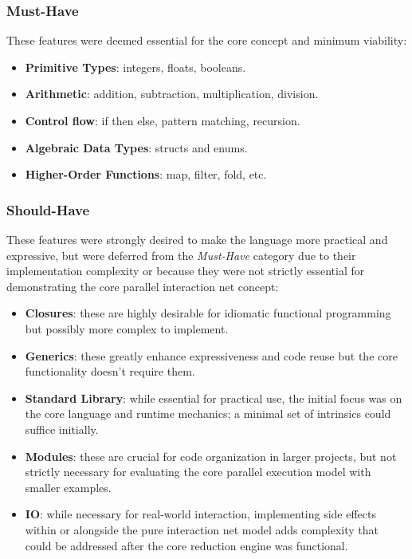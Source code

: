\subsubsection*{Must-Have}
These features were deemed essential for the core concept and minimum viability:
\begin{itemize}
    \item \textbf{Primitive Types}: integers, floats, booleans.
    \item \textbf{Arithmetic}: addition, subtraction, multiplication, division.
    \item \textbf{Control flow}: if then else, pattern matching, recursion.
    \item \textbf{Algebraic Data Types}: structs and enums.
    \item \textbf{Higher-Order Functions}: map, filter, fold, etc.
\end{itemize}

\subsubsection*{Should-Have}
These features were strongly desired to make the language more practical and expressive, but were deferred from the \textit{Must-Have} category due to their implementation complexity or because they were not strictly essential for demonstrating the core parallel interaction net concept:
\begin{itemize}
    \item \textbf{Closures}: these are highly desirable for idiomatic functional programming but possibly more complex to implement.
    \item \textbf{Generics}: these greatly enhance expressiveness and code reuse but the core functionality doesn't require them.
    \item \textbf{Standard Library}: while essential for practical use, the initial focus was on the core language and runtime mechanics; a minimal set of intrinsics could suffice initially.
    \item \textbf{Modules}: these are crucial for code organization in larger projects, but not strictly necessary for evaluating the core parallel execution model with smaller examples.
    \item \textbf{IO}: while necessary for real-world interaction, implementing side effects within or alongside the pure interaction net model adds complexity that could be addressed after the core reduction engine was functional.
\end{itemize}

